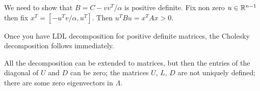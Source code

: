 \documentclass[a4paper,twoside,justified]{tufte-handout}
\begin{document}
We need to show that $B = C - vv^{T}/\alpha $ is positive definite. Fix
non zero $ u\in\mathbb{R}^{n-1} $ then fix $ x^{T}=[-u^{T}v/\alpha, u^{T}]
$. Then $ u^{T}Bu = x^{T}Ax > 0$.

Once you have LDL decomposition for positive definite matrices,
the Cholesky decomposition follows immediately.

All the decomposition can be extended to  matrices, but then the entries of the diagonal of $ U
$ and $D$ can be zero; the matrices $ U $, $ L $, $ D $ are not uniquely
defined; there are some zero eigenvectors in $ \Lambda $.



\end{document}
